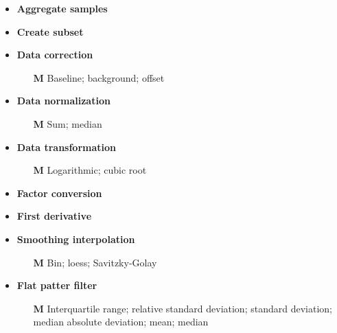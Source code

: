 \begin{multicols}{2}
	\begin{itemize}
		\item \textbf{Aggregate samples}
		\item \textbf{Create subset}	
		\item \textbf{Data correction}
		\begin{itemize}
			\item[\textbf{M}] Baseline; background; offset
		\end{itemize}
		\item \textbf{Data normalization}
		\begin{itemize}
			\item[\textbf{M}] Sum; median
		\end{itemize}
		\item \textbf{Data transformation}
		\begin{itemize}
			\item[\textbf{M}] Logarithmic; cubic root
		\end{itemize}
		\item \textbf{Factor conversion}
		\item \textbf{First derivative}
		\item \textbf{Smoothing interpolation}
		\begin{itemize}
			\item[\textbf{M}] Bin; loess; Savitzky-Golay
		\end{itemize}
		\item \textbf{Flat patter filter}
		\begin{itemize}
			\item[\textbf{M}] Interquartile range; relative standard deviation; standard deviation; median absolute deviation; mean; median

\end{itemize}
\end{itemize}
\end{multicols}
